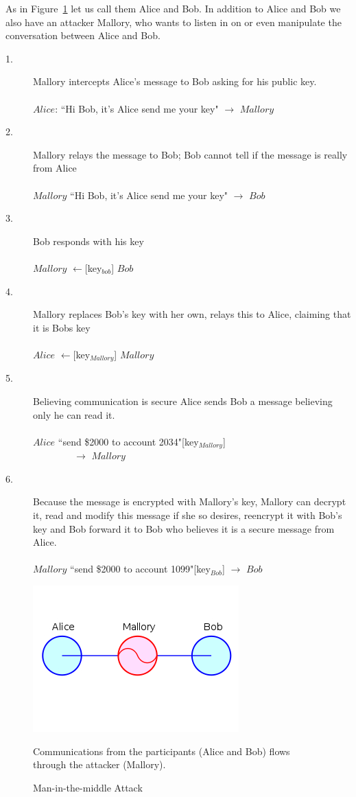 \documentclass{sig-alternate}
\begin{document}
 As in Figure~\ref{MIM} let us call them Alice and Bob. In addition to Alice and Bob we also have an attacker Mallory, who wants to listen in on or even manipulate the conversation between Alice and Bob.
	\begin{description}
	\item[1.] Mallory intercepts Alice's message to Bob asking for his public key.\hfill\\\\
	$Alice$: ``Hi Bob, it's Alice send me your key" $\rightarrow$ $Mallory$
	\item[2.] Mallory relays the message to Bob; Bob cannot tell if the message is really from Alice \hfill\\\\
	 $Mallory$ ``Hi Bob, it's Alice send me your key" $\rightarrow$ $Bob$ 	
	\item[3.]Bob responds with his key \hfill\\\\
	$Mallory$ $\leftarrow$[key$_{bob}$]  $Bob$
	\item[4.] Mallory replaces Bob's key with her own, relays this to  Alice, claiming that it is Bobs key\hfill\\\\
	$Alice$ $\leftarrow$[key$_{Mallory}$] $Mallory$
	\item[5.]
	Believing communication is secure Alice sends Bob a message believing only he can read it. \hfill\\\\
	$Alice$ ``send \$2000 to account 2034"[key$_{Mallory}$] \\
	$~\quad\quad\quad\quad\rightarrow$ $Mallory$
	\item[6.] Because the message is encrypted with Mallory's key, Mallory can decrypt it, read and modify this message if she so desires, reencrypt it with Bob's key and Bob forward it to Bob who believes it is a secure message from Alice. \hfill\\\\
	$Mallory$ ``send \$2000 to account 1099"[key$_{Bob}$] $\rightarrow$ $Bob$
	\end{description}	
	\begin{figure}
		\centering
		\includegraphics[scale=.5, bb= 65 65 250 250]{MIM.jpg}
		\caption[Man-in-the-middle Attack]{Man-in-the-middle Attack \cite{wiki:man}}
		 Communications from the participants (Alice and Bob) flows through the attacker (Mallory).
		\label{MIM}
		\end{figure}
		
\end{document}
